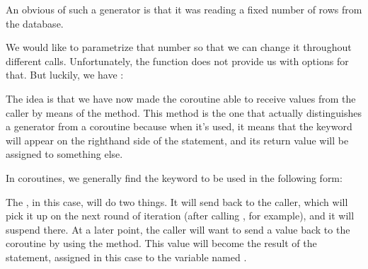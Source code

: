 \documentclass[a4paper,10pt,english]{sphinxmanual}
\begin{document}
An obvious of such a generator is that it was reading a fixed number of rows from the
database.

We would like to parametrize that number so that we can change it throughout
different calls. Unfortunately, the  function does not provide us with options for
that. But luckily, we have :

\begin{sphinxVerbatim}[commandchars=\\\{\}]
 
      
      

         
               
               
                  

              
              

     
\end{sphinxVerbatim}

The idea is that we have now made the coroutine able to receive values from the caller by
means of the  method. This method is the one that actually distinguishes a
generator from a coroutine because when it’s used, it means that the  keyword will
appear on the right\sphinxhyphen{}hand side of the statement, and its return value will be assigned to
something else.

In coroutines, we generally find the  keyword to be used in the following form:

The , in this case, will do two things. It will send  back to the caller, which
will pick it up on the next round of iteration (after calling , for example), and it will
suspend there. At a later point, the caller will want to send a value back to the coroutine by
using the  method. This value will become the result of the  statement,
assigned in this case to the variable named .
\end{document}
